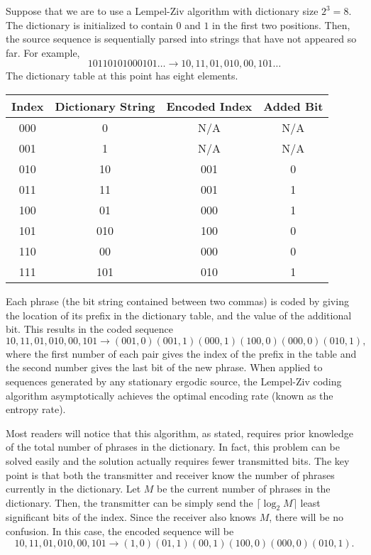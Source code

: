 \begin{example}
Suppose that we are to use a Lempel-Ziv algorithm with dictionary size $2^3 = 8$.
The dictionary is initialized to contain $0$ and $1$ in the first two positions.
Then, the source sequence is sequentially parsed into strings that have not appeared so far.
For example, 
\begin{equation*}
10110101000101 \ldots \rightarrow 10,11,01,010,00,101 \ldots
\end{equation*}
The dictionary table at this point has eight elements.

\begin{center}
\begin{tabular}{|c|c|c|c|}
\hline
Index & Dictionary String & Encoded Index & Added Bit \\
\hline
000 & 0 & N/A & N/A \\
001 & 1 & N/A & N/A \\
010 & 10 & 001 & 0 \\
011 & 11 & 001 & 1 \\
100 & 01 & 000 & 1 \\
101 & 010 & 100 & 0 \\
110 & 00 & 000 & 0 \\
111 & 101 & 010 & 1 \\
\hline
\end{tabular}
\end{center}

Each phrase (the bit string contained between two commas) is coded by giving the location of its prefix in the dictionary table, and the value of the additional bit.
This results in the coded sequence
\begin{equation*}
10,11,01,010,00,101 \rightarrow (001, 0)(001, 1)(000, 1)(100, 0)(000, 0)(010, 1),
\end{equation*}
where the first number of each pair gives the index of the prefix in the table and the second number gives the last bit of the new phrase. 
When applied to sequences generated by any stationary ergodic source, the Lempel-Ziv coding algorithm asymptotically achieves the optimal encoding rate (known as the entropy rate).
\end{example}

Most readers will notice that this algorithm, as stated, requires prior knowledge of the total number of phrases in the dictionary.
In fact, this problem can be solved easily and the solution actually requires fewer transmitted bits.
The key point is that both the transmitter and receiver know the number of phrases currently in the dictionary.
Let $M$ be the current number of phrases in the dictionary.
Then, the transmitter can be simply send the $\lceil \log_2 M \rceil$ least significant bits of the index.
Since the receiver also knows $M$, there will be no confusion.
In this case, the encoded sequence will be
\begin{equation*}
10,11,01,010,00,101 \rightarrow (1, 0)(01, 1)(00, 1)(100, 0)(000, 0)(010, 1).
\end{equation*}

